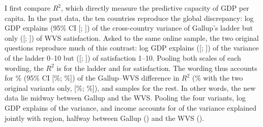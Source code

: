 \documentclass[12pt]{article}
\begin{document}
I first compare $R^2$, which directly measure the predictive capacity of GDP per capita. In the past data, the ten countries reproduce the global discrepancy: log GDP explains \RtwoTenGallup (95\% CI [\decompLowRGallup; \decompHighRGallup]) of the cross-country variance of Gallup's ladder but only \RtwoTenWVS ([\decompLowRWvs; \decompHighRWvs]) of WVS satisfaction. Asked to the same online sample, the two original questions reproduce much of this contrast: log GDP explains \RtwoTenFabreLadder ([\decompLowRFabreLadder; \decompHighRFabreLadder]) of the variance of the ladder 0--10 but \RtwoTenFabreSatisfaction ([\decompLowRFabreSatisfaction; \decompHighRFabreSatisfaction]) of satisfaction 1--10. Pooling both scales of each wording, the $R^2$ is \RtwoTenFabreLadderPooled for the ladder and \RtwoTenFabreSatisfactionPooled for satisfaction. The wording thus accounts for \decompShareRWordingPooledPct\% (95\% CI [\decompLowShareRWordingPooledPct\%; \decompHighShareRWordingPooledPct\%]) of the Gallup--WVS difference in $R^2$ (\decompShareRWordingPct\% with the two original variants only, [\decompLowShareRWordingPct\%; \decompHighShareRWordingPct\%]), and samples for the rest. In other words, the new data lie midway between Gallup and the WVS. Pooling the four variants, log GDP explains \RtwoTenFabreAll of the variance, and income accounts for \shareIncomeTenFabreAll of the variance explained jointly with region, halfway between Gallup (\shareIncomeTenGallup) and the WVS (\shareIncomeTenWVS). 

\end{document}
